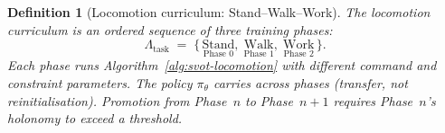 \documentclass[11pt,a4paper]{article}
\newtheorem{definition}[theorem]{Definition}
\begin{document}
\begin{definition}[Locomotion curriculum:
  Stand--Walk--Work]%
\label{def:locomotion-curriculum}
\color{black!60}%
The \emph{locomotion curriculum} is an ordered
sequence of three training phases:
\begin{equation}\label{eq:curriculum}
  \Lambda_{\mathrm{task}}
  \;=\;
  \bigl\{\,
    \underset{\text{Phase 0}}{\mathrm{Stand}},\;
    \underset{\text{Phase 1}}{\mathrm{Walk}},\;
    \underset{\text{Phase 2}}{\mathrm{Work}}
  \,\bigr\}.
\end{equation}
Each phase runs Algorithm~\ref{alg:svot-locomotion}
with different command and constraint parameters.
The policy $\pi_\theta$ carries across phases
(transfer, not reinitialisation).
Promotion from Phase~$n$ to Phase~$n{+}1$
requires Phase~$n$'s holonomy to exceed a threshold.


\end{definition}
\end{document}
